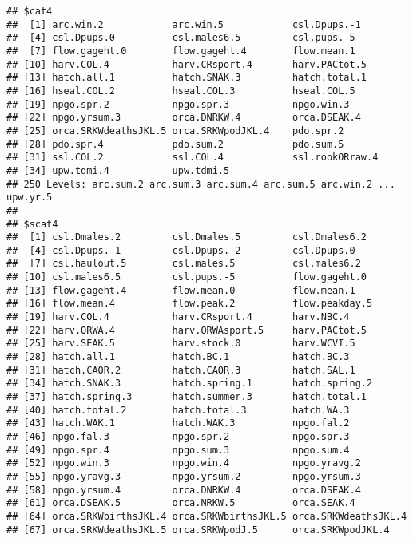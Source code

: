 \documentclass[]{article}
\begin{document}
\begin{verbatim}
## $cat4
##  [1] arc.win.2            arc.win.5            csl.Dpups.-1        
##  [4] csl.Dpups.0          csl.males6.5         csl.pups.-5         
##  [7] flow.gageht.0        flow.gageht.4        flow.mean.1         
## [10] harv.COL.4           harv.CRsport.4       harv.PACtot.5       
## [13] hatch.all.1          hatch.SNAK.3         hatch.total.1       
## [16] hseal.COL.2          hseal.COL.3          hseal.COL.5         
## [19] npgo.spr.2           npgo.spr.3           npgo.win.3          
## [22] npgo.yrsum.3         orca.DNRKW.4         orca.DSEAK.4        
## [25] orca.SRKWdeathsJKL.5 orca.SRKWpodJKL.4    pdo.spr.2           
## [28] pdo.spr.4            pdo.sum.2            pdo.sum.5           
## [31] ssl.COL.2            ssl.COL.4            ssl.rookORraw.4     
## [34] upw.tdmi.4           upw.tdmi.5          
## 250 Levels: arc.sum.2 arc.sum.3 arc.sum.4 arc.sum.5 arc.win.2 ... upw.yr.5
## 
## $scat4
##  [1] csl.Dmales.2         csl.Dmales.5         csl.Dmales6.2       
##  [4] csl.Dpups.-1         csl.Dpups.-2         csl.Dpups.0         
##  [7] csl.haulout.5        csl.males.5          csl.males6.2        
## [10] csl.males6.5         csl.pups.-5          flow.gageht.0       
## [13] flow.gageht.4        flow.mean.0          flow.mean.1         
## [16] flow.mean.4          flow.peak.2          flow.peakday.5      
## [19] harv.COL.4           harv.CRsport.4       harv.NBC.4          
## [22] harv.ORWA.4          harv.ORWAsport.5     harv.PACtot.5       
## [25] harv.SEAK.5          harv.stock.0         harv.WCVI.5         
## [28] hatch.all.1          hatch.BC.1           hatch.BC.3          
## [31] hatch.CAOR.2         hatch.CAOR.3         hatch.SAL.1         
## [34] hatch.SNAK.3         hatch.spring.1       hatch.spring.2      
## [37] hatch.spring.3       hatch.summer.3       hatch.total.1       
## [40] hatch.total.2        hatch.total.3        hatch.WA.3          
## [43] hatch.WAK.1          hatch.WAK.3          npgo.fal.2          
## [46] npgo.fal.3           npgo.spr.2           npgo.spr.3          
## [49] npgo.spr.4           npgo.sum.3           npgo.sum.4          
## [52] npgo.win.3           npgo.win.4           npgo.yravg.2        
## [55] npgo.yravg.3         npgo.yrsum.2         npgo.yrsum.3        
## [58] npgo.yrsum.4         orca.DNRKW.4         orca.DSEAK.4        
## [61] orca.DSEAK.5         orca.NRKW.5          orca.SEAK.4         
## [64] orca.SRKWbirthsJKL.4 orca.SRKWbirthsJKL.5 orca.SRKWdeathsJKL.4
## [67] orca.SRKWdeathsJKL.5 orca.SRKWpodJ.5      orca.SRKWpodJKL.4   

\end{verbatim}
\end{document}
